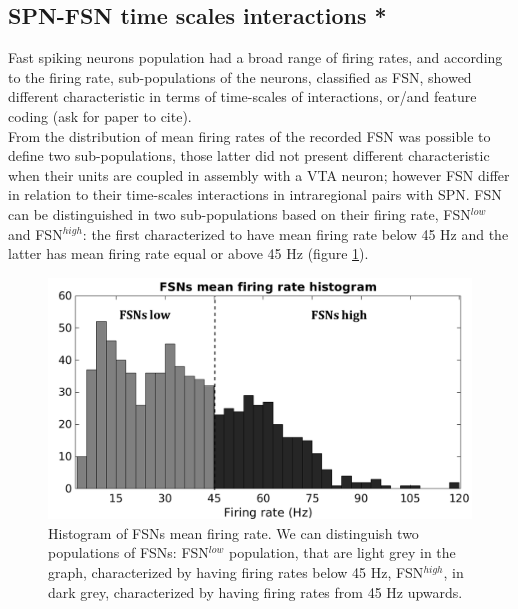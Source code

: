 \subsection{SPN-FSN time scales interactions *}
\label{sec:SPN-FSN_Bin}
Fast spiking neurons population had a broad range of firing rates, and according to the firing rate, sub-populations of the neurons, classified as FSN, showed different characteristic in terms of time-scales of interactions, or/and feature coding ({\color{red}ask for paper to cite}).\\From the distribution of mean firing rates of the recorded FSN was possible to define two sub-populations, those latter did not present different characteristic when their units are coupled in assembly with a VTA neuron; however FSN differ in relation to their time-scales interactions in intraregional pairs with SPN. FSN can be distinguished in two sub-populations based on their firing rate, FSN$^{low}$ and FSN$^{high}$: the first characterized to have mean firing rate below 45 Hz and the latter has mean firing rate equal or above 45 Hz (figure \ref{fig:FSNsFireHisto}).\\
\begin{figure}
    \centering
    \includegraphics[scale=0.6]{figures/FSNFiringRateLightDark.pdf}
    \caption{Histogram of FSNs mean firing rate. We can distinguish two populations of FSNs: FSN$^{low}$ population, that are light grey in the graph, characterized by having firing rates below 45 Hz, FSN$^{high}$, in dark grey, characterized by having firing rates from 45 Hz upwards.}
    \label{fig:FSNsFireHisto}
\end{figure}
